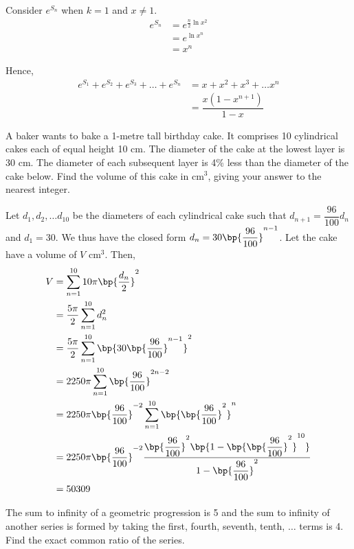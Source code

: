 \documentclass{echw}
\begin{document}
        Consider $e^{S_n}$ when $k = 1$ and $x \neq 1$.
        \begin{align*}
            e^{S_n} &= e^{\tfrac{n}2 \ln x^2}\\
            &= e^{\ln{x^n}}\\
            &= x^n
        \end{align*}

        Hence,
        \begin{align*}
            e^{S_1} + e^{S_2} + e^{S_3} + \ldots + e^{S_n} &= x + x^2 + x^3 + \ldots x^n\\
            &= \dfrac{x(1-x^{n+1})}{1-x}
        \end{align*}


    \problem{}
        A baker wants to bake a 1-metre tall birthday cake. It comprises 10 cylindrical cakes each of equal height 10 cm. The diameter of the cake at the lowest layer is 30 cm. The diameter of each subsequent layer is 4\% less than the diameter of the cake below. Find the volume of this cake in cm$^3$, giving your answer to the nearest integer.

    \solution
        Let $d_1, d_2, \ldots d_{10}$ be the diameters of each cylindrical cake such that $d_{n+1} = \dfrac{96}{100}d_n$ and $d_1 = 30$. We thus have the closed form $d_n = 30\bp{\dfrac{96}{100}}^{n-1}$. Let the cake have a volume of $V$ cm$^3$. Then,
        \begin{align*}
            V &= \sum_{n=1}^{10} 10\pi \bp{\dfrac{d_n}2}^2 \\
            &= \dfrac{5\pi}2 \sum_{n=1}^{10} d^2_n \\
            &= \dfrac{5\pi}2 \sum_{n=1}^{10} \bp{30\bp{\dfrac{96}{100}}^{n-1}}^2\\
            &= 2250\pi \sum_{n=1}^{10} \bp{\dfrac{96}{100}}^{2n-2}\\
            &= 2250\pi \bp{\dfrac{96}{100}}^{-2} \sum_{n=1}^{10} \bp{\bp{\dfrac{96}{100}}^2}^{n}\\
            &= 2250\pi \bp{\dfrac{96}{100}}^{-2} \dfrac{\bp{\dfrac{96}{100}}^2 \bp{1 - \bp{\bp{\dfrac{96}{100}}^2}^{10}}}{1-\bp{\dfrac{96}{100}}^2}\\
            &= 50309
        \end{align*}


    \problem{}
        The sum to infinity of a geometric progression is 5 and the sum to infinity of another series is formed by taking the first, fourth, seventh, tenth, $\ldots$ terms is 4. Find the exact common ratio of the series.
\end{document}
